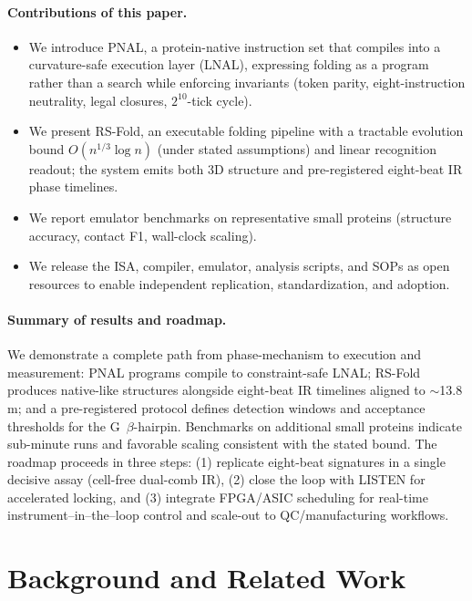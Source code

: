 \documentclass[12pt,a4paper]{article}
\begin{document}
\paragraph{Contributions of this paper.}
\begin{itemize}
  \item We introduce PNAL, a protein-native instruction set that compiles into a curvature-safe execution layer (LNAL), expressing folding as a program rather than a search while enforcing invariants (token parity, eight-instruction neutrality, legal closures, $2^{10}$-tick cycle).
  \item We present RS-Fold, an executable folding pipeline with a tractable evolution bound $O(n^{1/3}\log n)$ (under stated assumptions) and linear recognition readout; the system emits both 3D structure and pre-registered eight-beat IR phase timelines.
  \item We report emulator benchmarks on representative small proteins (structure accuracy, contact F1, wall-clock scaling).
  \item We release the ISA, compiler, emulator, analysis scripts, and SOPs as open resources to enable independent replication, standardization, and adoption.
\end{itemize}

\paragraph{Summary of results and roadmap.}
We demonstrate a complete path from phase-mechanism to execution and measurement: PNAL programs compile to constraint-safe LNAL; RS-Fold produces native-like structures alongside eight-beat IR timelines aligned to $\sim$13.8\,\textmu m; and a pre-registered protocol defines detection windows and acceptance thresholds for the G~$\beta$-hairpin. Benchmarks on additional small proteins indicate sub-minute runs and favorable scaling consistent with the stated bound. The roadmap proceeds in three steps: (1) replicate eight-beat signatures in a single decisive assay (cell-free dual-comb IR), (2) close the loop with LISTEN for accelerated locking, and (3) integrate FPGA/ASIC scheduling for real-time instrument–in–the–loop control and scale-out to QC/manufacturing workflows.

\section{Background and Related Work}
\end{document}

